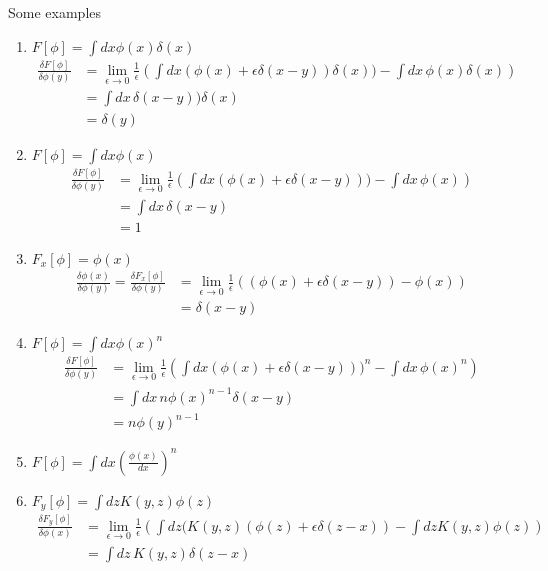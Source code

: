 \documentclass[10pt,a4paper]{article}
\theoremstyle{definition}
\begin{document}
Some examples
\begin{enumerate}
    \item $F[\phi]=\int dx \phi(x)\delta(x)$
    \begin{align}
        \frac{\delta F[\phi]}{\delta\phi(y)}
           &=\lim_{\epsilon\rightarrow0}\frac{1}{\epsilon}\left(\int dx(\phi(x)+\epsilon\delta(x-y))\delta(x))-\int
        dx\,\phi(x)\delta(x)\right)\\
        &=\int dx\,\delta(x-y))\delta(x)\\
       &=\delta(y)
    \end{align}
    \item $F[\phi]=\int dx \phi(x)$
    \begin{align}
        \frac{\delta F[\phi]}{\delta\phi(y)}
        &=\lim_{\epsilon\rightarrow0}\frac{1}{\epsilon}\left(\int dx(\phi(x)+\epsilon\delta(x-y)))-\int dx\,\phi(x)\right)\\
        &=\int dx\,\delta(x-y)\\
        &=1
    \end{align}
    \item $F_x[\phi]=\phi(x)$
    \begin{align}
        \frac{\delta \phi(x)}{\delta\phi(y)}=\frac{\delta F_x[\phi]}{\delta\phi(y)}
        &=\lim_{\epsilon\rightarrow0}\frac{1}{\epsilon}\left((\phi(x)+\epsilon\delta(x-y))-\phi(x)\right)\\
        &=\delta(x-y)
    \end{align}
    \item $F[\phi]=\int dx \phi(x)^n$
    \begin{align}
        \frac{\delta F[\phi]}{\delta\phi(y)}
        &=\lim_{\epsilon\rightarrow0}\frac{1}{\epsilon}\left(\int dx(\phi(x)+\epsilon\delta(x-y)))^n-\int dx\,\phi(x)^n\right)\\
        &=\int dx\,n\phi(x)^{n-1}\delta(x-y)\\
        &=n\phi(y)^{n-1}
    \end{align}
    \item $F[\phi]=\int dx \left(\frac{\phi(x)}{dx}\right)^n$
    \item $F_y[\phi]=\int dz K(y,z)\phi(z)$
    \begin{align}
        \frac{\delta F_y[\phi]}{\delta\phi(x)}
           &=\lim_{\epsilon\rightarrow0}\frac{1}{\epsilon}\left(\int dz(K(y,z)(\phi(z)+\epsilon\delta(z-x)) -\int dz K(y,z)\phi(z)\right)\\
           &=\int dz\,K(y,z)\delta(z-x)\\

\end{align}
\end{enumerate}
\end{document}
